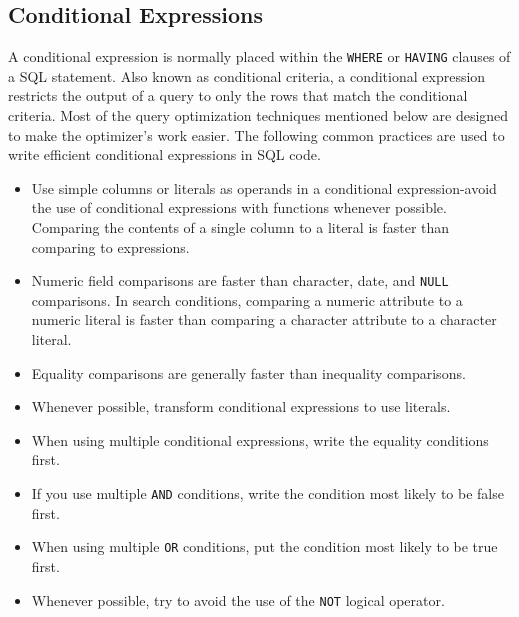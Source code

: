 \documentclass[a4paper, 11pt, titlepage]{report}
\begin{document}
\subsection{Conditional Expressions}
A conditional expression is normally placed within the \texttt{WHERE} or \texttt{HAVING} clauses of
a SQL statement. Also known as conditional criteria, a conditional expression restricts the output of a query to only the rows that match the conditional criteria. Most of the query optimization techniques mentioned below are designed to make the optimizer's work easier. The following common practices are used to write efficient conditional expressions in SQL code.
\begin{itemize}
\item Use simple columns or literals as operands in a conditional expression-avoid the use of conditional expressions with functions whenever possible. Comparing the contents of a single column to a literal is faster than comparing to expressions.
\item Numeric field comparisons are faster than character, date, and \texttt{NULL} comparisons. In search conditions, comparing a numeric attribute to a numeric literal is faster than comparing a character attribute to a character literal.
\item Equality comparisons are generally faster than inequality comparisons.
\item Whenever possible, transform conditional expressions to use literals.
\item When using multiple conditional expressions, write the equality conditions first.
\item If you use multiple \texttt{AND} conditions, write the condition most likely to be false first.
\item When using multiple \texttt{OR} conditions, put the condition most likely to be true first.
\item Whenever possible, try to avoid the use of the \texttt{NOT} logical operator.
\end{itemize}
\end{document}
